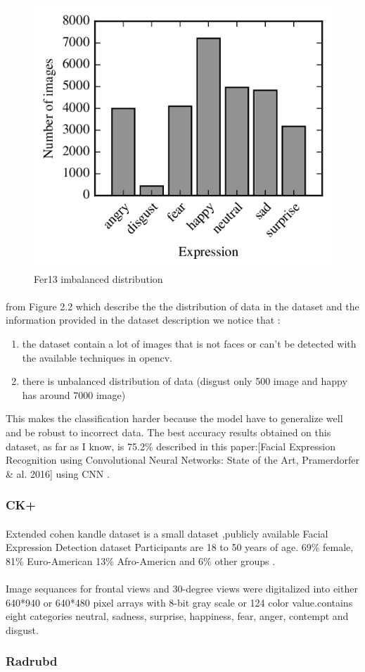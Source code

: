 \begin{figure}
	\centering
	\includegraphics[width=.5\textwidth]{images/fer_dis.png}
	\caption{Fer13 imbalanced distribution}
	\label{fig:fer13}
\end{figure} 
\paragraph{}
from Figure 2.2 which describe the the distribution of data in the dataset and the information provided in the dataset description we notice that :
\begin{enumerate}
	\item the dataset contain a lot of images that is not faces or can't be detected with the available techniques in opencv.
	\item there is unbalanced distribution of data (disgust only 500 image and happy has around 7000 image)   
\end{enumerate}

 This makes the classification harder because the model have to generalize well and be robust to incorrect data. The best accuracy results obtained on this dataset, as far as I know, is 75.2\% described in this paper:\cite{state_of_art}[Facial Expression Recognition using Convolutional Neural Networks: State of the Art, Pramerdorfer \& al. 2016] using CNN .

\subsubsection{CK+}
\paragraph{}
Extended cohen kandle dataset is a small dataset ,publicly available Facial Expression Detection dataset Participants are 18 to 50 years of age. 69\% female, 81\% Euro-American 
13\% Afro-Americn and 6\% other groups .
\paragraph{}
Image sequances for frontal views and 30-degree views were digitalized into either 640*940 or 640*480 pixel arrays with 8-bit gray scale or 124 color value.contains eight categories neutral, sadness, surprise, happiness, fear, anger, contempt and disgust.	
\subsubsection{Radrubd}


